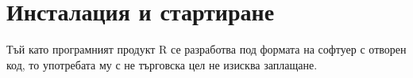 \newpage
\chapter{Инсталация и стартиране}
\label{chapter01}

Тъй като програмният продукт R се разработва под формата на софтуер с отворен код, то употребата му с не търговска цел не изисква заплащане. 